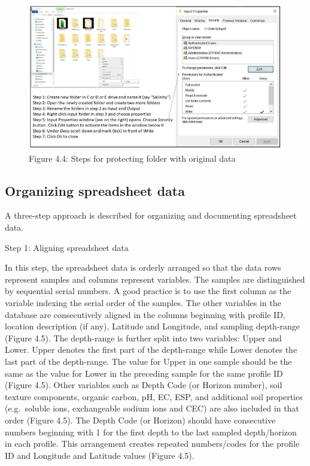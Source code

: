 \documentclass[
  10pt,
  b5paper,
]{book}
\begin{document}
\begin{figure}
\centering
\includegraphics{figures/images/Figure4.4.PNG}
\caption{Figure 4.4: Steps for protecting folder with original data}
\end{figure}

\hypertarget{organizing-spreadsheet-data}{%
\subsection{Organizing spreadsheet data}\label{organizing-spreadsheet-data}}

A three-step approach is described for organizing and documenting spreadsheet data.

Step 1: Aligning spreadsheet data

In this step, the spreadsheet data is orderly arranged so that the data rows represent samples and columns represent variables. The samples are distinguished by sequential serial numbers. A good practice is to use the first column as the variable indexing the serial order of the samples. The other variables in the database are consecutively aligned in the columns beginning with profile ID, location description (if any), Latitude and Longitude, and sampling depth-range (Figure 4.5). The depth-range is further split into two variables: Upper and Lower. Upper denotes the first part of the depth-range while Lower denotes the last part of the depth-range. The value for Upper in one sample should be the same as the value for Lower in the preceding sample for the same profile ID (Figure 4.5). Other variables such as Depth Code (or Horizon number), soil texture components, organic carbon, pH, EC, ESP, and additional soil properties (e.g.~soluble ions, exchangeable sodium ions and CEC) are also included in that order (Figure 4.5). The Depth Code (or Horizon) should have consecutive numbers beginning with 1 for the first depth to the last sampled depth/horizon in each profile. This arrangement creates repeated numbers/codes for the profile ID and Longitude and Latitude values (Figure 4.5).
\end{document}
